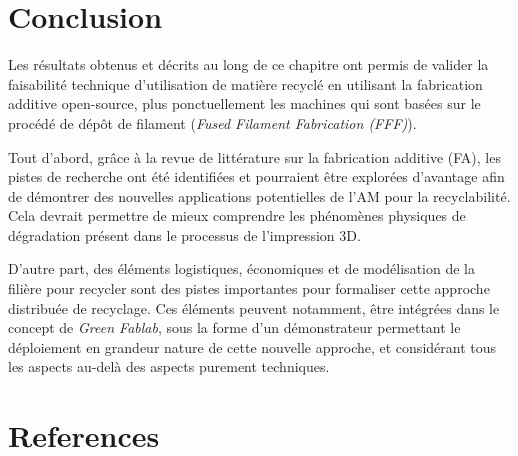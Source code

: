 \documentclass[
]{article}
\begin{document}
\hypertarget{conclusion}{%
\section{Conclusion}\label{conclusion}}

Les résultats obtenus et décrits au long de ce chapitre ont permis de valider la faisabilité technique d'utilisation de matière recyclé en utilisant la fabrication additive open-source, plus ponctuellement les machines qui sont basées sur le procédé de dépôt de filament (\emph{Fused Filament Fabrication (FFF)}).

Tout d'abord, grâce à la revue de littérature sur la fabrication additive (FA), les pistes de recherche ont été identifiées et pourraient être explorées d'avantage afin de démontrer des nouvelles applications potentielles de l'AM pour la recyclabilité. Cela devrait permettre de mieux comprendre les phénomènes physiques de dégradation présent dans le processus de l'impression 3D.

D'autre part, des éléments logistiques, économiques et de modélisation de la filière pour recycler sont des pistes importantes pour formaliser cette approche distribuée de recyclage. Ces éléments peuvent notamment, être intégrées dans le concept de \emph{Green Fablab}, sous la forme d'un démonstrateur permettant le déploiement en grandeur nature de cette nouvelle approche, et considérant tous les aspects au-delà des aspects purement techniques.

\hypertarget{references}{%
\section*{References}\label{references}}
\end{document}
